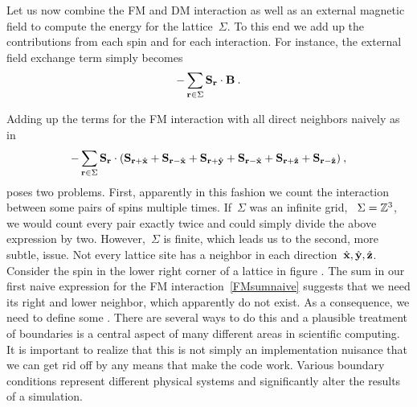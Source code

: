 Let us now combine the FM and DM interaction as well as an external magnetic
field to compute the energy for the lattice~$\Sigma$. To this end we add up the
contributions from each spin and for each interaction. For instance, the
external field exchange term simply becomes
%
\begin{equation}\label{Bsum}
  -\sum_{\mathbf{r} \in \Sigma} \mathbf{S}_{\mathbf{r}} \cdot \mathbf{B}\:.
\end{equation}
%

Adding up the terms for the FM interaction with all direct neighbors naively as
in
%
\begin{equation}\label{FMsumnaive}
  -\sum_{\mathbf{r} \in \Sigma} \mathbf{S}_{\mathbf{r}} \cdot (\mathbf{S}_{\mathbf{r} + \hat{\mathbf{x}}} + \mathbf{S}_{\mathbf{r} - \hat{\mathbf{x}}} +
    \mathbf{S}_{\mathbf{r} + \hat{\mathbf{y}}} + \mathbf{S}_{\mathbf{r} - \hat{\mathbf{x}}} + \mathbf{S}_{\mathbf{r} + \hat{\mathbf{z}}} + \mathbf{S}_{\mathbf{r} - \hat{\mathbf{z}}})\:,
\end{equation}
%
poses two problems. First, apparently in this fashion we count the interaction
between some pairs of spins multiple times. If~$\Sigma$ was an infinite grid,
\ie{}~$\Sigma=\mathbb{Z}^3$, we would count every pair exactly twice and could simply
divide the above expression by two. However,~$\Sigma$ is finite, which leads us
to the second, more subtle, issue. Not every lattice site has a neighbor in each
direction~$\hat{\mathbf{x}}, \hat{\mathbf{y}}, \hat{\mathbf{z}}$. Consider the spin in the lower right corner of a
lattice in figure . The sum in our first naive expression for the
FM interaction~\eqref{FMsumnaive} suggests that we need its right and lower
neighbor, which apparently do not exist. As a consequence, we need to define
some . There are several ways to do this and a
plausible treatment of boundaries is a central aspect of many different areas in
scientific computing. It is important to realize that this is not simply an
implementation nuisance that we can get rid off by any means that make the code
work. Various boundary conditions represent different physical systems and
significantly alter the results of a simulation.

